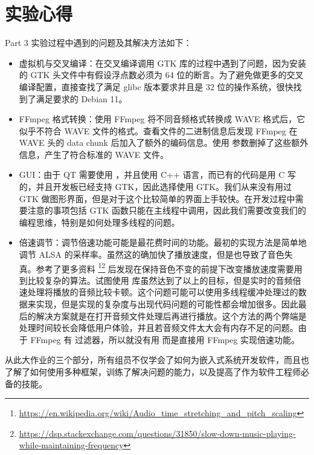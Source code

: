 \newpage

\section{实验心得}

Part 3 实验过程中遇到的问题及其解决方法如下：

\begin{itemize}
    \item 虚拟机与交叉编译：在交叉编译调用 GTK 库的过程中遇到了问题，因为安装的 GTK 头文件中有假设浮点数必须为 64 位的断言。为了避免做更多的交叉编译配置，直接查找了满足 glibc 版本要求并且是 32 位的操作系统，很快找到了满足要求的 Debian 11。
    \item FFmpeg 格式转换：使用 FFmpeg 将不同音频格式转换成 WAVE 格式后，它似乎不符合 WAVE 文件的格式。查看文件的二进制信息后发现 FFmpeg 在 WAVE 头的 data chunk 后加入了额外的编码信息。使用  参数删掉了这些额外信息，产生了符合标准的 WAVE 文件。
    \item GUI：由于 QT 需要使用 ，并且使用 C++ 语言，而已有的代码是用 C 写的，并且开发板已经支持 GTK，因此选择使用 GTK。我们从来没有用过 GTK 做图形界面，但是对于这个比较简单的界面上手较快。在开发过程中需要注意的事项包括 GTK 函数只能在主线程中调用，因此我们需要改变我们的编程思维，特别是如何处理多线程的问题。
    \item 倍速调节：调节倍速功能可能是最花费时间的功能。最初的实现方法是简单地调节 ALSA 的采样率。虽然这的确加快了播放速度，但是也导致了音色失真。参考了更多资料 \footnote{\url{https://en.wikipedia.org/wiki/Audio_time_stretching_and_pitch_scaling}}\footnote{\url{https://dsp.stackexchange.com/questions/31850/slow-down-music-playing-while-maintaining-frequency}} 后发现在保持音色不变的前提下改变播放速度需要用到比较复杂的算法。试图使用 \href{https://github.com/dbry/audio-stretch}{} 库虽然达到了以上的目标，但是实时的音频倍速处理将播放的音频比较卡顿。这个问题可能可以使用多线程缓冲处理过的数据来实现，但是实现的复杂度与出现代码问题的可能性都会增加很多。因此最后的解决方案就是在打开音频文件处理后再进行播放。这个方法的两个弊端是处理时间较长会降低用户体验，并且若音频文件太大会有内存不足的问题。由于 FFmpeg 有  过滤器，所以就没有用  而是直接用 FFmpeg 实现倍速功能。
\end{itemize}

从此大作业的三个部分，所有组员不仅学会了如何为嵌入式系统开发软件，而且也了解了如何使用多种框架，训练了解决问题的能力，以及提高了作为软件工程师必备的技能。